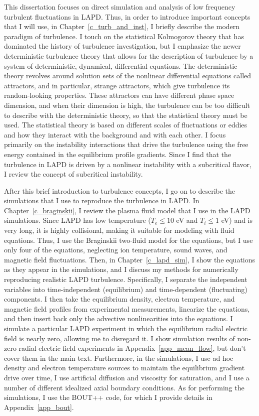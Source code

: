 This dissertation focuses on direct simulation and analysis of low frequency turbulent fluctuations in LAPD. Thus, in order to introduce important concepts that I will use, 
in Chapter~\ref{c_turb_and_inst}, I briefly describe the modern paradigm of turbulence. I touch on the statistical Kolmogorov theory that has dominated the history of turbulence investigation,
but I emphasize the newer deterministic turbulence theory that allows for the description of turbulence
by a system of deterministic, dynamical, differential equations. The deterministic theory revolves around solution sets of the nonlinear differential equations called attractors, and in particular,
strange attractors, which give turbulence its random-looking properties. These attractors can have different phase space dimension, and when their dimension is high, the turbulence can be too
difficult to describe with the deterministic theory, so that the statistical theory must be used. The statistical theory is based on different scales of fluctuations or eddies and how they
interact with the background and with each other. I focus primarily on the instability interactions that drive the turbulence using the free energy contained in the equilibrium profile gradients.
Since I find that the turbulence in LAPD is driven by a nonlinear instability with a subcritical flavor, I review the concept of subcritical instability.

After this brief introduction to turbulence concepts, I go on to describe the simulations that I use to reproduce the turbulence in LAPD. In Chapter~\ref{c_braginskii}, I review
the plasma fluid model that I use in the LAPD simulations. Since LAPD has low temperature ($T_e \le 10$ eV and $T_i \le 1$ eV) and is very long,
it is highly collisional, making it suitable for modeling with fluid equations. Thus, I use the Braginskii two-fluid model for the equations, but I use only four of the equations,
neglecting ion temperature, sound waves, and magnetic field fluctuations. Then, in Chapter~\ref{c_lapd_sim}, I show the equations as they appear in the simulations, and I
discuss my methods for numerically reproducing realistic LAPD turbulence. Specifically, I separate the independent variables into time-independent (equilibrium) and time-dependent (fluctuating)
components. I then take the equilibrium density, electron temperature, and magnetic field profiles from experimental measurements, linearize the equations, and then insert back
only the advective nonlinearities into the equations. I simulate a particular LAPD experiment in which the equilibrium radial electric field is nearly zero, allowing me to disregard it.
I show simulation results of non-zero radial electric field experiments in Appendix~\ref{app_mean_flow}, but don't cover them in the main text.
Furthermore, in the simulations, I use ad hoc density and electron temperature sources to maintain the equilibrium gradient drive over time, I use artificial diffusion and viscosity for saturation,
and I use a number of different idealized axial boundary conditions.
As for performing the simulations, I use the BOUT++ code, for which I provide details in Appendix~\ref{app_bout}.

